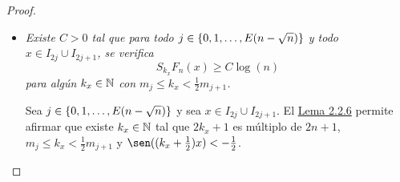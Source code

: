 \documentclass[a4paper, 12pt, oneside]{book}
\begin{document}
\begin{proof}
\begin{itemize}
\begin{align*}
            S_{k}f_n(x) &\geq \frac{1}{2n}\sum_{i=j+1}^n \Bigl(\frac{m_i-k}{m_i+1}+2\sum_{m=1}^{k}\frac{m_i-k}{m_i+1}\cos(m(x-x_{2i}))\Bigr) \\
            &= \frac{1}{2n}\sum_{i=j+1}^n \frac{m_i-k}{m_i+1}\Bigl(1+2\sum_{m=1}^{k} \cos(m(x-x_{2i}))\Bigr) \\
            &= \frac{1}{2n}\sum_{i=j+1}^n \frac{m_i-k}{m_i+1}D_{k}(x-x_{2i}).
        \end{align*}
        Esto completa la prueba de \hyperref[2.2.12]{\color{blue}(2.2.12)}.
        \item \textit{Existe $C > 0$ tal que para todo $j \in \{0,1,\mathellipsis,E(n-\sqrt{n})\}$ y todo $x \in I_{2j}\cup I_{2j+1}$, se verifica
        \begin{equation}\label{2.2.11}
            S_{k_x}F_n(x) \geq C\log(n)
        \end{equation}
        para algún $k_x \in \mathbb N$ con $m_j \leq k_x < \frac{1}{2}m_{j+1}$.
        }

        Sea $j \in \{0,1,\mathellipsis,E(n-\sqrt{n})\}$ y sea $x \in I_{2j} \cup I_{2j+1}$. El \hyperref[2.2.6]{\color{blue}Lema 2.2.6} permite afirmar que existe $k_x \in \mathbb N$ tal que $2k_x+1$ es múltiplo de $2n+1$, $m_{j} \leq k_x < \frac{1}{2}m_{j+1}$ y $\sen((k_x+\frac{1}{2})x) < -\frac{1}{2}$.


\end{itemize}
\end{proof}
\end{document}
